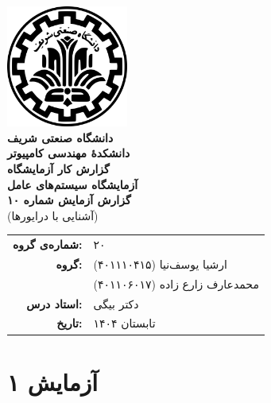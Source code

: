 \documentclass[12pt]{article}
\newcommand{\persianordinal}[1]{%
	\ifcase#1
	\or اول%
	\or دوم%
	\or سوم%
	\or چهارم%
	\or پنجم%
	\or ششم%
	\or هفتم%
	\or هشتم%
	\or نهم%
	\or دهم%
	\or یازدهم%
	\or دوازدهم%
	\or سیزدهم%
	\or چهاردهم%
	\or پانزدهم%
	\or شانزدهم%
	\or هفدهم%
	\or هجدهم%
	\or نوزدهم%
	\or بیستم%
	\else #1\fi
}
\newcommand{\persianordinalpage}{\persianfont\persianordinal{\value{page}}}
\begin{document}
	
	\begin{titlepage}
		\centering
		\vspace*{1cm}
		\includegraphics[width=4cm]{sharif.png}\\[1.5cm]
		{\Large\textbf{دانشگاه صنعتی شریف}}\\[0.5cm]
		{\large\textbf{دانشکده‌ٔ مهندسی کامپیوتر}}\\[1.5cm]
		{\Huge\textbf{گزارش کار آزمایشگاه}}\\[0.5cm]
		{\LARGE\textbf{آزمایشگاه سیستم‌های عامل}}\\[2cm]
		
		\textbf{گزارش آزمایش شماره ۱۰}\\
		(آشنایی با درایور‌ها)
		
		\vfill
		\begin{tabular}{rl}
			\textbf{شماره‌ی گروه:} & ۲۰ \\
			\textbf{گروه:} &
			ارشیا یوسف‌نیا (۴۰۱۱۱۰۴۱۵) \\
			& محمدعارف زارع زاده (۴۰۱۱۰۶۰۱۷) \\
			\textbf{استاد درس:} & دکتر بیگی \\
			\textbf{تاریخ:} & تابستان ۱۴۰۴ \\
		\end{tabular}
	\end{titlepage}
	
	\clearpage
	\setcounter{page}{1}
	\renewcommand{\thepage}{\persianordinalpage}
	
	\tableofcontents
	\clearpage
	\listoffigures
	
	\clearpage
	\setcounter{page}{1}
	\renewcommand{\thepage}{\persianfont\arabic{page}}
	
	
	\section{آزمایش ۱}
\end{document}
